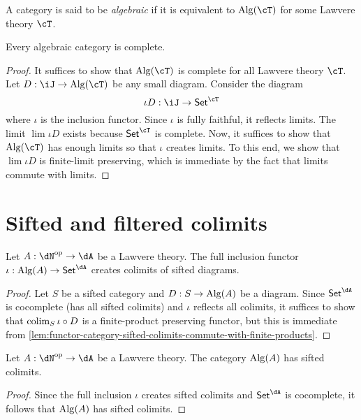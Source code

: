 \documentclass{zett}
\begin{document}
\begin{defn}
  A category is said to be \emph{algebraic} if it is equivalent to $\Alg(\cT)$ for some Lawvere theory $\cT$.
\end{defn}

\begin{thm}
  Every algebraic category is complete.
\end{thm}
\begin{proof}
  It suffices to show that $\Alg(\cT)$ is complete for all Lawvere theory $\cT$.
  Let $D : \iJ \to \Alg(\cT)$ be any small diagram.
  Consider the diagram
  \[
    \iota D : \iJ \to \CSet^{\cT}
  \]
  where $\iota$ is the inclusion functor.
  Since $\iota$ is fully faithful, it reflects limits.
  The limit $\lim \iota D$ exists because $\CSet^{\cT}$ is complete.
  Now, it suffices to show that $\Alg(\cT)$ has enough limits so that $\iota$ creates limits.
  To this end, we show that $\lim \iota D$ is finite-limit preserving, which is immediate by the fact that limits commute with limits.
\end{proof}



\section{Sifted and filtered colimits}
\label{sec:sifted-and-filtered-colimits}















\begin{lem}
  Let $A : \dN\op \to \dA$ be a Lawvere theory.
  The full inclusion functor $\iota : \Alg(A) \to \CSet^{\dA}$ creates colimits of sifted diagrams.
\end{lem}
\begin{proof}
  Let $S$ be a sifted category and $D : S \to \operatorname{Alg}(A)$ be a diagram.
  Since $\CSet^{\dA}$ is cocomplete (has all sifted colimits) and $\iota$ reflects all colimits, it suffices to show that $\operatorname{colim}_{S}\iota \circ D$ is a finite-product preserving functor, but this is immediate from \cref{lem:functor-category-sifted-colimits-commute-with-finite-products}.
\end{proof}

\begin{thm}\label{thm:algebraic-categories-has-sifted-colimits}
  Let $A : \dN\op \to \dA$ be a Lawvere theory.
  The category $\operatorname{Alg}(A)$ has sifted colimits.
\end{thm}
\begin{proof}
  Since the full inclusion $\iota$ creates sifted colimits and $\CSet^{\dA}$ is cocomplete, it follows that $\operatorname{Alg}(A)$ has sifted colimits.
\end{proof}
\end{document}
